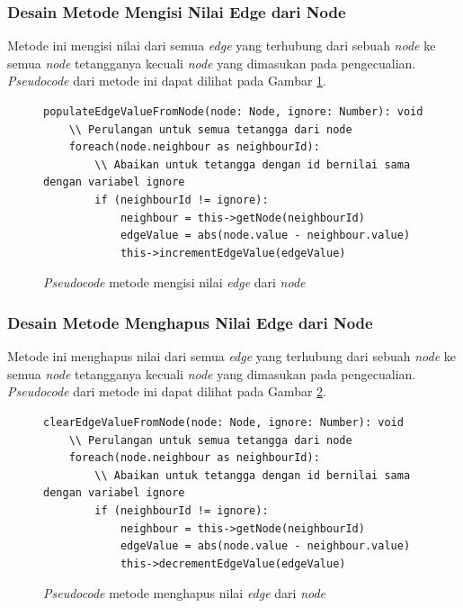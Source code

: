 \subsubsection{Desain Metode Mengisi Nilai Edge dari Node}
Metode ini mengisi nilai dari semua \textit{edge} yang terhubung dari sebuah \textit{node} ke semua \textit{node} tetangganya kecuali \textit{node} yang dimasukan pada pengecualian. \textit{Pseudocode} dari metode ini dapat dilihat pada Gambar \ref{psdo:tree_populateEdgeValueFromNode}.

\begin{figure}[ht]
	\begin{lstlisting}[firstnumber=0]
	populateEdgeValueFromNode(node: Node, ignore: Number): void
	\\ Perulangan untuk semua tetangga dari node
	foreach(node.neighbour as neighbourId):
		\\ Abaikan untuk tetangga dengan id bernilai sama dengan variabel ignore
		if (neighbourId != ignore):
			neighbour = this->getNode(neighbourId)
			edgeValue = abs(node.value - neighbour.value)
			this->incrementEdgeValue(edgeValue)
	\end{lstlisting}
	\caption{\textit{Pseudocode} metode mengisi nilai \textit{edge} dari \textit{node}}
	\label{psdo:tree_populateEdgeValueFromNode}
\end{figure}

\subsubsection{Desain Metode Menghapus Nilai Edge dari Node}
Metode ini menghapus nilai dari semua \textit{edge} yang terhubung dari sebuah \textit{node} ke semua \textit{node} tetangganya kecuali \textit{node} yang dimasukan pada pengecualian. \textit{Pseudocode} dari metode ini dapat dilihat pada Gambar \ref{psdo:tree_clearEdgeValueFromNode}.

\begin{figure}[ht]
	\begin{lstlisting}[firstnumber=0]
	clearEdgeValueFromNode(node: Node, ignore: Number): void
	\\ Perulangan untuk semua tetangga dari node
	foreach(node.neighbour as neighbourId):
		\\ Abaikan untuk tetangga dengan id bernilai sama dengan variabel ignore
		if (neighbourId != ignore):
			neighbour = this->getNode(neighbourId)
			edgeValue = abs(node.value - neighbour.value)
			this->decrementEdgeValue(edgeValue)
	\end{lstlisting}
	\caption{\textit{Pseudocode} metode menghapus nilai \textit{edge} dari \textit{node}}
	\label{psdo:tree_clearEdgeValueFromNode}
\end{figure}

